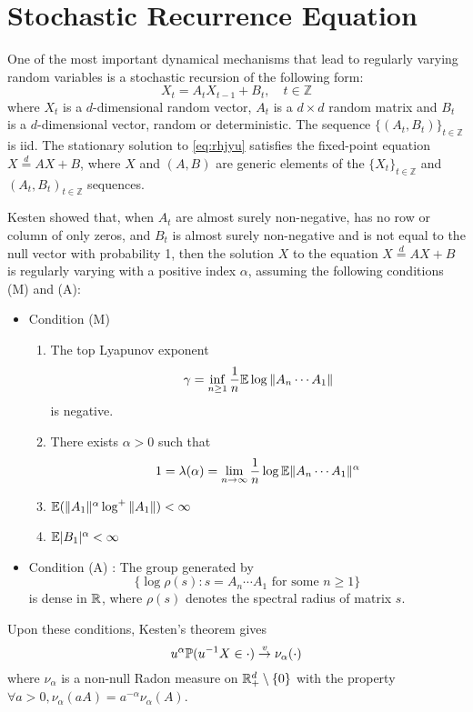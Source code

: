 \section{Stochastic Recurrence Equation}
One of the most important dynamical mechanisms that lead to regularly
varying random variables is a stochastic recursion of the following form:
\begin{equation}
  \label{eq:rhjyu}
  X_t = A_t X_{t-1} + B_t, \quad t \in \mathbb Z
\end{equation}
where $X_t$ is a $d$-dimensional random vector, $A_t$ is a $d\times d$
random matrix and $B_t$ is a $d$-dimensional vector, random or
deterministic. The sequence $\{(A_t, B_t)\}_{t \in \mathbb Z}$ is
iid. The stationary solution to \eqref{eq:rhjyu} satisfies the fixed-point
equation $X \overset{d}{=} A X + B$, where $X$ and $(A, B)$ are
generic elements of the $\{X_t\}_{t \in \mathbb Z}$ and
$(A_t, B_t)_{t \in \mathbb Z}$ sequences.

Kesten \cite{kesten:1973} showed that, when $A_t$ are almost
surely non-negative, has no row or column of only zeros, and
$B_t$ is almost surely non-negative and is not equal to the null
vector with probability 1, then the solution $X$ to the equation
$X \overset{d}{=} A X + B$ is regularly varying with a positive index
$\alpha$, assuming the following conditions (M) and (A):
\begin{itemize}
\item Condition (M)
  \begin{enumerate}
  \item The top Lyapunov exponent
    \[
    \gamma = \inf_{n \geq 1} {1 \over n}\mathbb{E} \log \|A_n \cdots A_1\|
    \]
    is negative.
  \item There exists $\alpha > 0$ such that
    \[
    1 = \lambda(\alpha) = \lim_{n \to \infty} {1 \over n} \log \mathbb{E} \|A_n \cdots A_1\|^\alpha
    \]
  \item $\mathbb{E} (\|A_1\|^\alpha \log^+\|A_1\|) < \infty$
  \item $\mathbb{E} |B_1|^\alpha < \infty$
  \end{enumerate}
\item Condition (A) : The group generated by
  \[
  \{\log\rho(s): s = A_n \cdots A_1 \text{ for some } n \geq 1\}
  \]
  is dense in $\mathbb R$, where $\rho(s)$ denotes the spectral
  radius of matrix $s$.
\end{itemize}
Upon these conditions, Kesten's theorem gives
\begin{equation}
  \label{eq:jorg}
  u^\alpha \P(u^{-1} X \in \cdot) \overset{v}{\to} \nu_\alpha(\cdot)
\end{equation}
where $\nu_\alpha$ is a non-null Radon measure on
$\mathbb R^d_+ \setminus \{0\}$ with the property
$\forall a > 0, \nu_\alpha(a A) = a^{-\alpha} \nu_\alpha(A)$.

